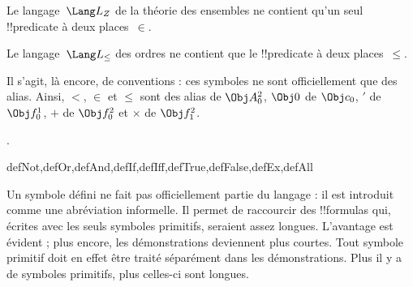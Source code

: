 \documentclass[../../../include/open-logic-section]{subfiles}
\begin{document}
\begin{ex}
Le langage~$\Lang L_Z$ de la théorie des ensembles ne contient qu'un
seul !!{predicate} à deux places~$\in$.
\end{ex}

\begin{ex}
Le langage~$\Lang L_\le$ des ordres ne contient que le
!!{predicate} à deux places~$\le$.
\end{ex}

Il s'agit, là encore, de conventions : ces symboles ne sont
officiellement que des alias. Ainsi, $<$, $\in$ et $\le$ sont des
alias de $\Obj A^2_0$, $\Obj 0$ de $\Obj c_0$, $\prime$ de
$\Obj f^1_0$, $+$ de $\Obj f^2_0$ et $\times$ de $\Obj f^2_1$.

.

\begin{tagblock}{defNot,defOr,defAnd,defIf,defIff,defTrue,defFalse,defEx,defAll}
\begin{explain}
Un symbole défini ne fait pas officiellement partie du langage : il
est introduit comme une abréviation informelle. Il permet de raccourcir
des !!{formula}s qui, écrites avec les seuls symboles primitifs,
seraient assez longues. L'avantage est évident ; plus encore, les
démonstrations deviennent plus courtes. Tout symbole primitif doit en
effet être traité séparément dans les démonstrations. Plus il y a de
symboles primitifs, plus celles-ci sont longues.
\end{explain}
\end{tagblock}

\end{document}
